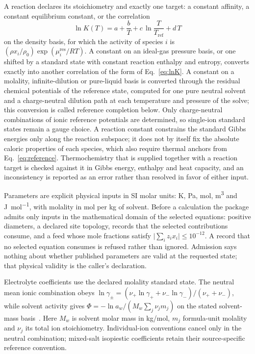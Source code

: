 A reaction declares its stoichiometry and exactly one target: a constant affinity, a constant equilibrium constant, or the correlation
\begin{equation}
\ln K(T)=a+\frac{b}{T}+c\,\ln\frac{T}{T_{\mathrm{ref}}}+d\,T
\label{eq:lnK}
\end{equation}
on the density basis, for which the activity of species $i$ is $(\rho x_i/\rho_0)\exp(\mu_i^{\mathrm{res}}/RT)$.
A constant on an ideal-gas pressure basis, or one shifted by a standard state with constant reaction enthalpy and entropy, converts exactly into another correlation of the form of Eq.~\eqref{eq:lnK}.
A constant on a molality, infinite-dilution or pure-liquid basis is converted through the residual chemical potentials of the reference state, computed for one pure neutral solvent and a charge-neutral dilution path at each temperature and pressure of the solve; this conversion is called reference completion below.
Only charge-neutral combinations of ionic reference potentials are determined, so single-ion standard states remain a gauge choice.
A reaction constant constrains the standard Gibbs energies only along the reaction subspace; it does not by itself fix the absolute caloric properties of each species, which also require thermal anchors from Eq.~\eqref{eq:reference}.
Thermochemistry that is supplied together with a reaction target is checked against it in Gibbs energy, enthalpy and heat capacity, and an inconsistency is reported as an error rather than resolved in favor of either input.

Parameters are explicit physical inputs in SI molar units: K, Pa, mol, \si{\cubic\metre} and \si{\joule\per\mol}, with molality in mol per kg of solvent.
Before a calculation the package admits only inputs in the mathematical domain of the selected equations: positive diameters, a declared site topology, records that the selected contributions consume, and a feed whose mole fractions satisfy $\lvert\sum_iz_ix_i\rvert\le10^{-12}$.
A record that no selected equation consumes is refused rather than ignored.
Admission says nothing about whether published parameters are valid at the requested state; that physical validity is the caller's declaration.

Electrolyte coefficients use the declared molality standard state.
The neutral mean ionic combination obeys $\ln\gamma_\pm=(\nu_+\ln\gamma_++\nu_-\ln\gamma_-)/(\nu_++\nu_-)$, while solvent activity gives $\Phi=-\ln a_w/(M_w\sum_j\nu_jm_j)$ on the stated solvent-mass basis~\citep{HamerWu1972,Held2014}.
Here $M_w$ is solvent molar mass in kg/mol, $m_j$ formula-unit molality and $\nu_j$ its total ion stoichiometry.
Individual-ion conventions cancel only in the neutral combination; mixed-salt isopiestic coefficients retain their source-specific reference convention.

